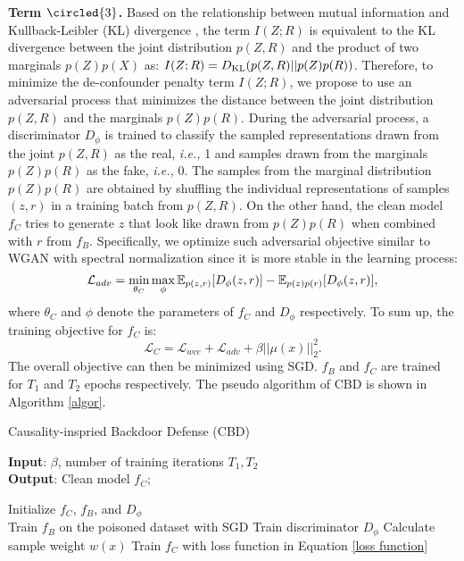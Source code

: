 \noindent \textbf{Term $\circled{3}$.} Based on the relationship between mutual information and Kullback-Leibler (KL) divergence \cite{belghazi2018mutual}, the term $I(Z; R)$ is equivalent to the KL divergence between the joint distribution $p(Z, R)$ and the product of two marginals $p(Z)p(X)$ as: $I(Z; R)=D_{\rm KL}(p(Z, R)||p(Z) p(R))$. Therefore, to minimize the de-confounder penalty term $I(Z;R)$, we propose to use an adversarial process that minimizes the distance between the joint distribution $p(Z,R)$ and the marginals $p(Z) p(R)$. During the adversarial process, a discriminator $D_\phi$ is trained to
classify the sampled representations drawn from the joint $p(Z,R)$ as the real, \emph{i.e.,} 1 and samples drawn from the marginals $p(Z) p(R)$ as the fake, \emph{i.e.,} 0. 
The samples from the marginal distribution $p(Z) p(R)$ are obtained by shuffling the individual representations of samples $(z,r)$ in
a training batch from $p(Z,R)$. On the other hand, the clean model $f_C$ tries to generate $z$ that look like
drawn from $p(Z) p(R)$ when combined with $r$ from $f_B$. 
Specifically, we optimize such adversarial objective similar to WGAN \cite{arjovsky2017wasserstein} with spectral normalization \cite{miyato2018spectral} since it is more stable in the learning process:
\begin{equation}
    \mathcal{L}_{adv} =\mathop{\rm min}\limits_{\theta_C} \mathop{ \rm max}\limits_{\phi} \mathbb{E}_{p(z,r)}[D_\phi(z,r)] - \mathbb{E}_{p(z)p(r)}[D_\phi(z,r)],
\end{equation}
where $\theta_C$ and $\phi$ denote the parameters of $f_C$ and $D_\phi$ respectively. To sum up, the training objective for $f_C$ is:
\begin{equation}
    \mathcal{L}_C = \mathcal{L}_{wce}+\mathcal{L}_{adv}+\beta||\mu(x)||_2^2.
\label{loss function}
\end{equation}
The overall objective can then be minimized using SGD. $f_B$ and $f_C$ are trained for $T_1$ and $T_2$ epochs respectively. The pseudo algorithm of CBD is shown in Algorithm \ref{algor}. 
\begin{algorithm}[t]
\caption{Causality-inspried Backdoor Defense (CBD)}
\textbf{Input}: $\beta$, number of training iterations $T_1, T_2$\\
\textbf{Output}: Clean model $f_C$;
\begin{algorithmic}[1]
\STATE Initialize $f_C$, $f_B$, and $D_\phi$\\
\STATE Train $f_B$ on the poisoned dataset with SGD
\ENDFOR
{}
\STATE Train discriminator $D_\phi$
\STATE Calculate sample weight $w(x)$
\STATE Train $f_C$ with loss function in Equation \ref{loss function}
\ENDFOR
\end{algorithmic}\label{algor}
\end{algorithm}

